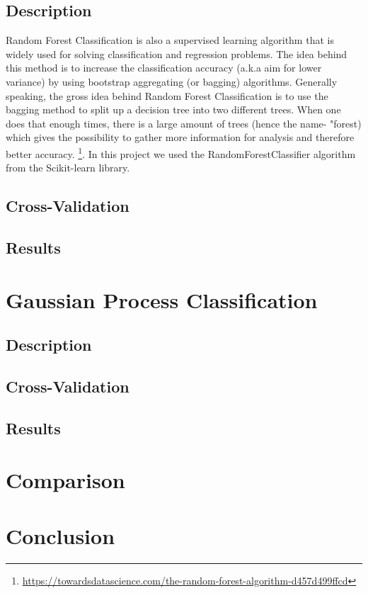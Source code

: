 \documentclass[twocolumn]{scrartcl}
\begin{document}
\subsection{Description}
Random Forest Classification is also a supervised learning algorithm that is widely used for solving classification and regression problems. The idea behind this method is to increase the classification accuracy (a.k.a aim for lower variance) by using bootstrap aggregating (or bagging) algorithms. Generally speaking, the gross idea behind Random Forest Classification is to use the bagging method to split up a decision tree into two different trees. When one does that enough times, there is a large amount of trees (hence the name- "forest) which gives the possibility to gather more information for analysis and therefore better accuracy. \footnote{\url{https://towardsdatascience.com/the-random-forest-algorithm-d457d499ffcd}}.
In this project we used the RandomForestClassifier algorithm from the Scikit-learn library.

\subsection{Cross-Validation}
\subsection{Results}

\section{Gaussian Process Classification}
\subsection{Description}
\subsection{Cross-Validation}
\subsection{Results}

\section{Comparison}
\section{Conclusion}

\printbibliography
\end{document}
